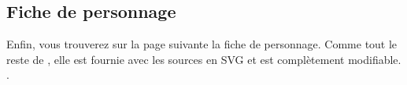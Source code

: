 \subsection{Fiche de personnage}
Enfin, vous trouverez sur la page suivante la fiche de personnage. Comme tout le reste de \swr, elle est fournie avec les sources en SVG et est complètement modifiable.\\

\cite{swr-character-sheet-src}.

\clearpage

